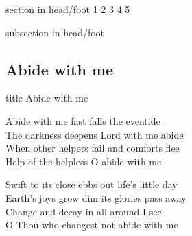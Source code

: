 \documentclass{beamer}
\begin{document}
{
{ 
 {
 \begin{beamercolorbox}[ht=4.5ex,dp=1.5ex,%
      leftskip=.3cm,rightskip=.3cm plus1fil]{section in head/foot}
 \fontsize{12}{25}\selectfont 
\hyperlink{Abide with me[]1}{1}
\hyperlink{Abide with me[]2}{2}
\hyperlink{Abide with me[]3}{3}
\hyperlink{Abide with me[]4}{4}
\hyperlink{Abide with me[]5}{5}
 
 \end{beamercolorbox}%
  \begin{beamercolorbox}[ht=2.5ex,dp=1.125ex,%
   leftskip=.3cm,rightskip=.3cm plus1fil]{subsection in head/foot}
   \insertauthor
 \end{beamercolorbox}%
 }
}
\subsection{ Abide with me }

\hypertarget{Abide with me[]}{}
\begin{frame}{}
 \vfill
  \centering
  \begin{beamercolorbox}[sep=8pt,center,shadow=true,rounded=true]{title}
    Abide with me     
  \end{beamercolorbox}
  \vfill
\end{frame}

\hypertarget{Abide with me[]1}{}
\begin{frame}{}
\fontsize{ 15 }{ 19 }\selectfont

Abide with me fast falls the eventide\\ 
The darkness deepens Lord with me abide\\ 
When other helpers fail and comforts flee\\ 
Help of the helpless O abide with me 

\end{frame}

\hypertarget{Abide with me[]2}{}
\begin{frame}{}
\fontsize{ 15 }{ 19 }\selectfont

Swift to its close ebbs out life's little day\\ 
Earth's joys grow dim its glories pass away\\ 
Change and decay in all around I see\\ 
O Thou who changest not abide with me 

\end{frame}

}
\end{document}
